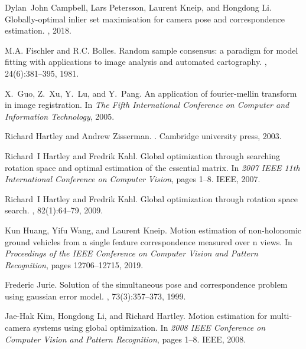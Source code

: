 \documentclass[letterpaper, 10 pt, conference]{ieeeconf}  %
\begin{document}
\begin{thebibliography}{10}
	Dylan~John Campbell, Lars Petersson, Laurent Kneip, and Hongdong Li.
	\newblock Globally-optimal inlier set maximisation for camera pose and
	  correspondence estimation.
	,
	  2018.
	
	M.A. Fischler and R.C. Bolles.
	\newblock Random sample consensus: a paradigm for model fitting with
	  applications to image analysis and automated cartography.
	, 24(6):381--395, 1981.
	
	X.~Guo, Z.~Xu, Y.~Lu, and Y.~Pang.
	\newblock An application of fourier-mellin transform in image registration.
	\newblock In {\em The Fifth International Conference on Computer and
	  Information Technology}, 2005.
	
	Richard Hartley and Andrew Zisserman.
	.
	\newblock Cambridge university press, 2003.
	
	Richard~I Hartley and Fredrik Kahl.
	\newblock Global optimization through searching rotation space and optimal
	  estimation of the essential matrix.
	\newblock In {\em 2007 IEEE 11th International Conference on Computer Vision},
	  pages 1--8. IEEE, 2007.
	
	Richard~I Hartley and Fredrik Kahl.
	\newblock Global optimization through rotation space search.
	, 82(1):64--79, 2009.
	
	Kun Huang, Yifu Wang, and Laurent Kneip.
	\newblock Motion estimation of non-holonomic ground vehicles from a single
	  feature correspondence measured over n views.
	\newblock In {\em Proceedings of the IEEE Conference on Computer Vision and
	  Pattern Recognition}, pages 12706--12715, 2019.
	
	Frederic Jurie.
	\newblock Solution of the simultaneous pose and correspondence problem using
	  gaussian error model.
	, 73(3):357--373, 1999.
	
	Jae-Hak Kim, Hongdong Li, and Richard Hartley.
	\newblock Motion estimation for multi-camera systems using global optimization.
	\newblock In {\em 2008 IEEE Conference on Computer Vision and Pattern
	  Recognition}, pages 1--8. IEEE, 2008.
	

\end{thebibliography}
\end{document}
